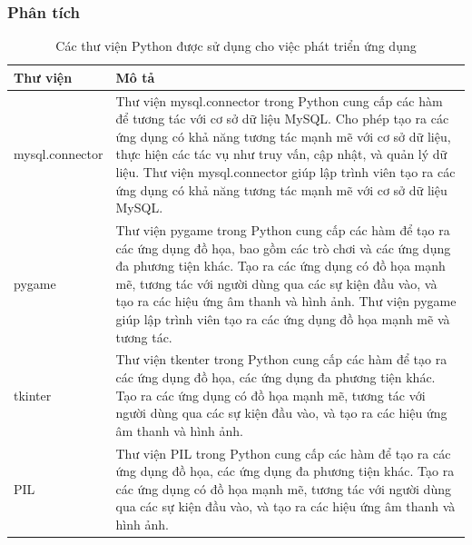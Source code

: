 \documentclass[a4paper]{article}
\begin{document}
\subsubsection{Phân tích}
\begin{table}[h]
	\centering
	\begin{tabular}{|l|p{10cm}|}
		\hline
		\textbf{Thư viện} & \textbf{Mô tả}                                                                                                                                                                                                                                                                                                                                                      \\
		\hline
		mysql.connector   & Thư viện mysql.connector trong Python cung cấp các hàm để tương tác với cơ sở dữ liệu MySQL. Cho phép tạo ra các ứng dụng có khả năng tương tác mạnh mẽ với cơ sở dữ liệu, thực hiện các tác vụ như truy vấn, cập nhật, và quản lý dữ liệu. Thư viện mysql.connector giúp lập trình viên tạo ra các ứng dụng có khả năng tương tác mạnh mẽ với cơ sở dữ liệu MySQL. \\
		\hline
		pygame            & Thư viện pygame trong Python cung cấp các hàm để tạo ra các ứng dụng đồ họa, bao gồm các trò chơi và các ứng dụng đa phương tiện khác. Tạo ra các ứng dụng có đồ họa mạnh mẽ, tương tác với người dùng qua các sự kiện đầu vào, và tạo ra các hiệu ứng âm thanh và hình ảnh. Thư viện pygame giúp lập trình viên tạo ra các ứng dụng đồ họa mạnh mẽ và tương tác.   \\
		\hline
		tkinter           & Thư viện tkenter trong Python cung cấp các hàm để tạo ra các ứng dụng đồ họa, các ứng dụng đa phương tiện khác. Tạo ra các ứng dụng có đồ họa mạnh mẽ, tương tác với người dùng qua các sự kiện đầu vào, và tạo ra các hiệu ứng âm thanh và hình ảnh.                                                                                                               \\
		\hline
		PIL               & Thư viện PIL trong Python cung cấp các hàm để tạo ra các ứng dụng đồ họa, các ứng dụng đa phương tiện khác. Tạo ra các ứng dụng có đồ họa mạnh mẽ, tương tác với người dùng qua các sự kiện đầu vào, và tạo ra các hiệu ứng âm thanh và hình ảnh.                                                                                                                   \\
		\hline
	\end{tabular}
	\caption{Các thư viện Python được sử dụng cho việc phát triển ứng dụng}
	\label{tab:my_label}
\end{table}
\clearpage
\newpage
\end{document}
